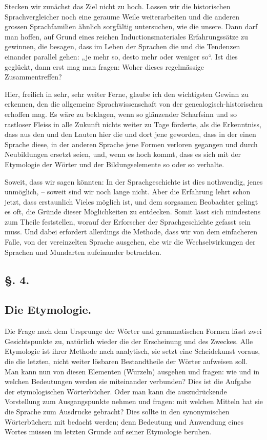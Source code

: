 {Stecken wir zunächst das Ziel nicht zu hoch. Lassen wir die historischen Sprachvergleicher noch eine geraume Weile weiterarbeiten und die anderen grossen Sprachfamilien ähnlich sorgfältig untersuchen, wie die unsere. Dann darf man hoffen, auf Grund eines reichen Inductionsmateriales Erfahrungssätze zu gewinnen, die besagen, dass im Leben der Sprachen die und die Tendenzen einander parallel gehen: „je mehr so, desto mehr oder weniger so“. Ist dies geglückt, dann erst mag man fragen: Woher dieses regelmässige Zusammentreffen?

Hier, freilich in sehr, sehr weiter Ferne, glaube ich den wichtigsten Gewinn zu erkennen, den die allgemeine Sprachwissenschaft von der genealogisch-historisch\-en erhoffen mag. Es wäre zu beklagen, wenn so glänzender Scharfsinn und so rastloser Fleiss in alle Zukunft nichts \label{fp.188} weiter zu Tage förderte, als die Erkenntniss, dass aus den und den Lauten hier die und dort jene geworden, dass in der einen Sprache diese, in der anderen Sprache jene Formen verloren gegangen und durch Neubildungen ersetzt seien, und, wenn es hoch kommt, dass es sich mit der Etymologie der Wörter und der Bildungselemente so oder so verhalte.

Soweit, dass wir sagen könnten: In der Sprachgeschichte ist dies nothwendig, jenes unmöglich, – soweit sind wir noch lange nicht. Aber die Erfahrung lehrt schon jetzt, dass erstaunlich Vieles möglich ist, und dem sorgsamen Beobachter gelingt es oft, die Gründe dieser Möglichkeiten zu entdecken. Somit \label{sp.179} lässt sich mindestens zum Theile feststellen, worauf der Erforscher der Sprachgeschichte gefasst sein muss. Und dabei erfordert allerdings die Methode, dass wir von dem einfacheren Falle, von der vereinzelten Sprache ausgehen, ehe wir die Wechselwirkungen der Sprachen und Mundarten aufeinander betrachten.

\subsection*{§. 4.}\label{III.II.4}
\subsection*{Die Etymologie.}
Die Frage nach dem Ursprunge der Wörter und grammatischen Formen lässt zwei Gesichtspunkte zu, natürlich wieder die der Erscheinung und des Zweckes. Alle Etymologie ist ihrer Methode nach analytisch, sie setzt eine Scheidekunst voraus, die die letzten, nicht weiter lösbaren Bestandtheile der Wörter aufweisen soll. Man kann nun von diesen Elementen (Wurzeln) ausgehen und fragen: wie und in welchen Bedeutungen werden sie miteinander verbunden? Dies ist die Aufgabe der etymologischen Wörterbücher. Oder man kann die auszudrückende Vorstellung zum Ausgangspunkte nehmen und fragen: mit welchen Mitteln hat sie die Sprache zum Ausdrucke gebracht? Dies sollte in den synonymischen Wörterbüchern mit bedacht werden; denn Bedeutung und Anwendung eines Wortes müssen im letzten Grunde auf seiner Etymologie beruhen.

}
